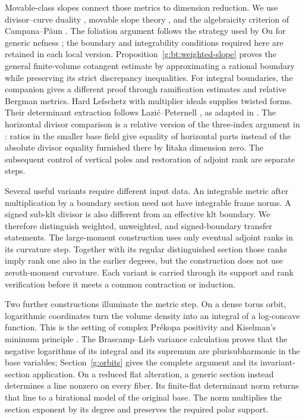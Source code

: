Movable-class slopes connect those metrics to dimension reduction.
We use divisor--curve duality \cite{BDPP2013}, movable slope theory
\cite{GKP2016}, and the algebraicity criterion of Campana--P\u aun
\cite{CampanaPaun2019}. The foliation argument follows the strategy
used by Ou for generic nefness \cite{Ou2023}; the boundary and
integrability conditions required here are retained in each local
version. Proposition~\ref{g:bt:weighted-slope} proves the general finite-volume
cotangent estimate by approximating a rational boundary while preserving
its strict discrepancy inequalities. For integral boundaries, the companion
\cite[Theorem ``Finite-volume cotangent bound'']{HFiniteVolume} gives a
different proof through ramification estimates and relative Bergman
metrics. Hard Lefschetz with multiplier ideals
\cite[Theorem~0.1]{DPS2001} supplies twisted forms. Their determinant
extraction follows Lazi\'c--Peternell \cite[Lemma~4.1]{LP2018}, as adapted
in \cite[Lemma~5.1]{LMPTX2023}. The horizontal divisor comparison is
a relative version of the three-index argument in
\cite[Theorem~3.1, Step~3]{LP2018}: ratios in the smaller base field
give equality of horizontal parts instead of the absolute divisor
equality furnished there by Iitaka dimension zero. The subsequent
control of vertical poles and restoration of adjoint rank are separate
steps.

Several useful variants require different input data. An integrable
metric after multiplication by a boundary section need not have
integrable frame norms. A signed sub-klt divisor is also different
from an effective klt boundary. We therefore distinguish weighted,
unweighted, and signed-boundary transfer statements. The large-moment
construction uses only eventual adjoint ranks in its curvature step.
Together with its regular distinguished section those ranks imply
rank one also in the earlier degrees, but the construction does not
use zeroth-moment curvature. Each variant is carried
through its support and rank verification before it meets a common
contraction or induction.

Two further constructions illuminate the metric step. On a dense torus
orbit, logarithmic coordinates turn the volume density into an integral
of a log-concave function. This is the setting of complex Pr\'ekopa
positivity and Kiselman's minimum principle
\cite{Kiselman1978,Berndtsson1998,Berndtsson2006}.
The Brascamp--Lieb variance calculation
\cite{BrascampLieb1976,KolesnikovMilman2017} proves that the negative logarithms of its integral and its supremum
are plurisubharmonic in the base variables; Section~\ref{g:orbits} gives the complete
argument and its invariant-section application. On a reduced flat
alteration, a generic section instead determines a line nonzero on
every fiber. Its finite-flat determinant norm returns that line to a
birational model of the original base. The norm multiplies the section
exponent by its degree and preserves the required polar support.

